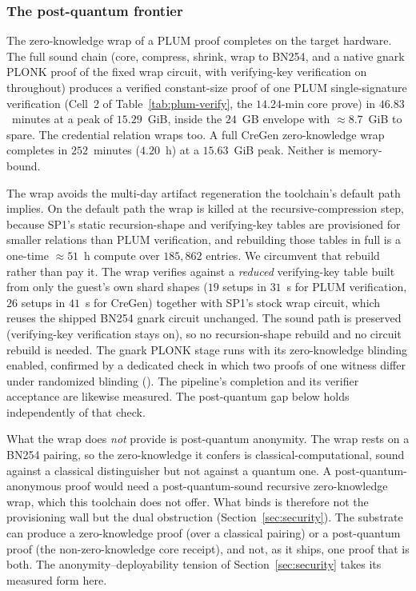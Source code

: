 \subsubsection{The post-quantum frontier}\label{ssec:resource-frontier}
The zero-knowledge wrap of a PLUM proof completes on the target hardware. The full sound chain (core, compress, shrink, wrap to {BN254}, and a native gnark {PLONK} proof of the fixed wrap circuit, with verifying-key verification on throughout) produces a verified constant-size proof of one PLUM single-signature verification (Cell~2 of Table~\ref{tab:plum-verify}, the $14.24$-min core prove) in $46.83$~minutes at a peak of $15.29$~GiB, inside the $24$~GB envelope with ${\approx}8.7$~GiB to spare. The credential relation wraps too. A full CreGen zero-knowledge wrap completes in $252$~minutes ($4.20$~h) at a $15.63$~GiB peak. Neither is memory-bound.

The wrap avoids the multi-day artifact regeneration the toolchain's default path implies. On the default path the wrap is killed at the recursive-compression step, because SP1's static recursion-shape and verifying-key tables are provisioned for smaller relations than PLUM verification, and rebuilding those tables in full is a one-time ${\approx}51$~h compute over $185{,}862$ entries. We circumvent that rebuild rather than pay it. The wrap verifies against a \emph{reduced} verifying-key table built from only the guest's own shard shapes ($19$ setups in $31$~s for PLUM verification, $26$ setups in $41$~s for CreGen) together with SP1's stock wrap circuit, which reuses the shipped {BN254} gnark circuit unchanged. The sound path is preserved (verifying-key verification stays on), so no recursion-shape rebuild and no circuit rebuild is needed. The gnark {PLONK} stage runs with its zero-knowledge blinding enabled, confirmed by a dedicated check in which two proofs of one witness differ under randomized blinding (). The pipeline's completion and its verifier acceptance are likewise measured. The post-quantum gap below holds independently of that check.

What the wrap does \emph{not} provide is post-quantum anonymity. The wrap rests on a {BN254} pairing, so the zero-knowledge it confers is classical-computational, sound against a classical distinguisher but not against a quantum one. A post-quantum-anonymous proof would need a post-quantum-sound recursive zero-knowledge wrap, which this toolchain does not offer. What binds is therefore not the provisioning wall but the dual obstruction (Section~\ref{sec:security}). The substrate can produce a zero-knowledge proof (over a classical pairing) or a post-quantum proof (the non-zero-knowledge core receipt), and not, as it ships, one proof that is both. The anonymity--deployability tension of Section~\ref{sec:security} takes its measured form here.


